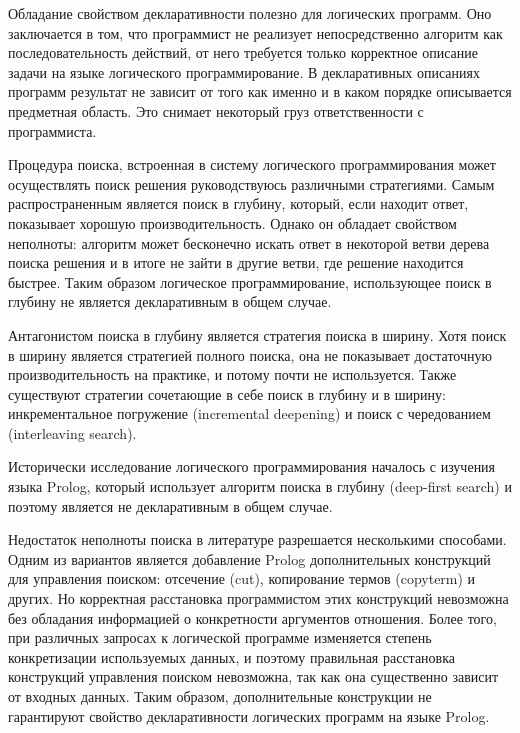Обладание свойством декларативности полезно для логических программ. Оно заключается в том, что программист не реализует непосредственно алгоритм как последовательность действий, от него требуется только корректное описание задачи на языке логического программирование. В декларативных описаниях программ результат не зависит от того как именно и в каком порядке описывается предметная область. Это снимает некоторый груз ответственности с программиста.

Процедура поиска, встроенная в систему логического программирования может осуществлять поиск решения руководствуюсь различными стратегиями. Самым распространенным является поиск в глубину, который, если находит ответ, показывает хорошую производительность. Однако он обладает свойством неполноты: алгоритм может бесконечно искать ответ в некоторой ветви дерева поиска решения и в итоге не зайти в другие ветви, где решение находится быстрее.
 Таким образом логическое программирование, использующее поиск в глубину не является декларативным в общем случае. 
 
Антагонистом поиска в глубину является стратегия поиска в ширину. Хотя поиск в ширину является стратегией полного поиска, она не показывает достаточную производительность на практике, и потому почти не используется. Также существуют стратегии сочетающие в себе поиск в глубину и в ширину: инкрементальное погружение (incremental deepening) и поиск с чередованием (interleaving search).

Исторически исследование логического программирования началось с изучения языка Prolog, который использует алгоритм поиска в глубину (deep-first search) и поэтому является не декларативным в общем случае. 

Недостаток неполноты поиска в литературе разрешается несколькими способами. Одним из вариантов является добавление Prolog дополнительных конструкций для управления поиском: отсечение (cut), копирование термов (copyterm) и других. Но корректная расстановка программистом этих конструкций невозможна без обладания информацией о конкретности аргументов отношения. Более того, при различных запросах к логической программе изменяется степень конкретизации используемых данных, и поэтому правильная расстановка конструкций управления поиском невозможна, так как она существенно зависит от входных данных. Таким образом, дополнительные конструкции не гарантируют свойство декларативности логических программ на языке Prolog.

